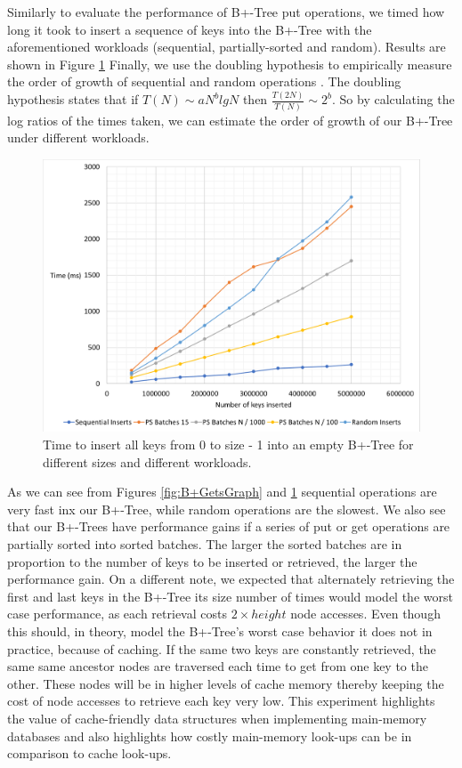 Similarly to evaluate the performance of B+-Tree put operations, we timed how long it took to insert a sequence of keys into the B+-Tree with the aforementioned workloads (sequential, partially-sorted and random). Results are shown in Figure \ref{fig:B+PutsGraph} Finally, we use the doubling hypothesis \cite{sedgewick2011algorithms} to empirically measure the order of growth of sequential and random operations . The doubling hypothesis states that if $T(N) \sim aN^blgN$ then $\frac{T(2N)}{T(N)} \sim 2^b$. So by calculating the log ratios of the times taken, we can estimate the order of growth of our B+-Tree under different workloads. 




\begin{figure}[htbp]
    \centering
    \includegraphics[scale=0.50]{figures/Btreeinsertsgraph.png}
    \caption{Time to insert all keys from 0 to size - 1 into an empty B+-Tree for different sizes and different workloads.}
    \label{fig:B+PutsGraph}
\end{figure}


As we can see from Figures \ref{fig:B+GetsGraph} and \ref{fig:B+PutsGraph} sequential operations are very fast inx our B+-Tree, while random operations are the slowest. We also see that our B+-Trees have performance gains if a series of put or get operations are partially sorted into sorted batches. The larger the sorted batches are in proportion to the number of keys to be inserted or retrieved, the larger the performance gain. On a different note, we expected that alternately retrieving the first and last keys in the B+-Tree its size number of times would model the worst case performance, as each retrieval costs $2 \times height$ node accesses. Even though this should, in theory, model the B+-Tree's worst case behavior it does not in practice, because of caching. If the same two keys are constantly retrieved, the same same ancestor nodes are traversed each time to get from one key to the other. These nodes will be in higher levels of cache memory thereby keeping the cost of node accesses to retrieve each key very low. This experiment highlights the value of cache-friendly data structures when implementing main-memory databases and also highlights how costly main-memory look-ups can be in comparison to cache look-ups.


